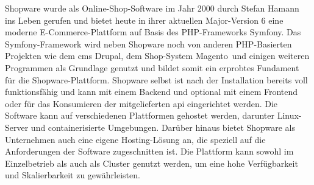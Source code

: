 Shopware wurde als Online-Shop-Software im Jahr 2000 durch Stefan Hamann ins Leben gerufen
und bietet heute in ihrer aktuellen Major-Version 6 eine moderne E-Commerce-Plattform auf Basis des PHP-Frameworks
\glqq Symfony\grqq.
Das Symfony-Framework wird neben Shopware noch von anderen PHP-Basierten Projekten wie dem \acrshort{cms} \glqq Drupal\grqq,
dem Shop-System \glqq Magento\grqq\ und einigen weiteren Programmen als Grundlage genutzt
und bildet somit ein erprobtes Fundament für die Shopware-Plattform.
Shopware selbst ist nach der Installation bereits voll funktionsfähig und kann mit einem Backend und optional
mit einem Frontend oder für das Konsumieren der mitgelieferten \acrshort{api} eingerichtet werden.
Die Software kann auf verschiedenen Plattformen gehostet werden, darunter Linux-Server und containerisierte Umgebungen.
Darüber hinaus bietet Shopware als Unternehmen auch eine eigene Hosting-Lösung an, die speziell auf die Anforderungen
der Software zugeschnitten ist.
Die Plattform kann sowohl im Einzelbetrieb als auch als Cluster genutzt werden, um eine hohe Verfügbarkeit und
Skalierbarkeit zu gewährleisten.

\clearpage
